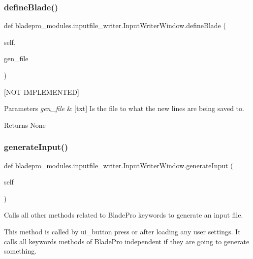 \subsubsection{\texorpdfstring{define\+Blade()}{defineBlade()}}
{\footnotesize\ttfamily def bladepro\+\_\+modules.\+inputfile\+\_\+writer.\+Input\+Writer\+Window.\+define\+Blade (\begin{DoxyParamCaption}\item[{}]{self,  }\item[{}]{gen\+\_\+file }\end{DoxyParamCaption})}



\mbox{[}N\+OT I\+M\+P\+L\+E\+M\+E\+N\+T\+ED\mbox{]} 


\begin{DoxyParams}{Parameters}
{\em gen\+\_\+file} & \mbox{[}txt\mbox{]} Is the file to what the new lines are being saved to. \\
\hline
\end{DoxyParams}
\begin{DoxyReturn}{Returns}
None 
\end{DoxyReturn}
\hypertarget{classbladepro__modules_1_1inputfile__writer_1_1_input_writer_window_a6ec74acbc44de3023188ddd8395b5b30}{}\label{classbladepro__modules_1_1inputfile__writer_1_1_input_writer_window_a6ec74acbc44de3023188ddd8395b5b30} 
\subsubsection{\texorpdfstring{generate\+Input()}{generateInput()}}
{\footnotesize\ttfamily def bladepro\+\_\+modules.\+inputfile\+\_\+writer.\+Input\+Writer\+Window.\+generate\+Input (\begin{DoxyParamCaption}\item[{}]{self }\end{DoxyParamCaption})}



Calls all other methods related to Blade\+Pro keywords to generate an input file. 

This method is called by ui\+\_\+button press or after loading any user settings. It calls all keywords methods of Blade\+Pro independent if they are going to generate something.

